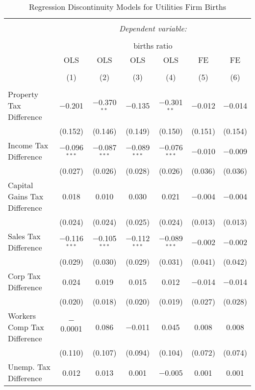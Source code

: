 
\begin{table}[!htbp] \centering 
  \caption{Regression Discontinuity Models for  Utilities Firm Births} 
  \label{22rd} 
\begin{tabular}{@{\extracolsep{5pt}}lcccccc} 
\\[-1.8ex]\hline 
\hline \\[-1.8ex] 
 & \multicolumn{6}{c}{\textit{Dependent variable:}} \\ 
\cline{2-7} 
\\[-1.8ex] & \multicolumn{6}{c}{births ratio} \\ 
 & OLS & OLS & OLS & OLS & FE & FE \\ 
\\[-1.8ex] & (1) & (2) & (3) & (4) & (5) & (6)\\ 
\hline \\[-1.8ex] 
 Property Tax Difference & $-$0.201 & $-$0.370$^{**}$ & $-$0.135 & $-$0.301$^{**}$ & $-$0.012 & $-$0.014 \\ 
  & (0.152) & (0.146) & (0.149) & (0.150) & (0.151) & (0.154) \\ 
  Income Tax Difference & $-$0.096$^{***}$ & $-$0.087$^{***}$ & $-$0.089$^{***}$ & $-$0.076$^{***}$ & $-$0.010 & $-$0.009 \\ 
  & (0.027) & (0.026) & (0.028) & (0.026) & (0.036) & (0.036) \\ 
  Capital Gains Tax Difference & 0.018 & 0.010 & 0.030 & 0.021 & $-$0.004 & $-$0.004 \\ 
  & (0.024) & (0.024) & (0.025) & (0.024) & (0.013) & (0.013) \\ 
  Sales Tax Difference & $-$0.116$^{***}$ & $-$0.105$^{***}$ & $-$0.112$^{***}$ & $-$0.089$^{***}$ & $-$0.002 & $-$0.002 \\ 
  & (0.029) & (0.030) & (0.029) & (0.031) & (0.041) & (0.042) \\ 
  Corp Tax Difference & 0.024 & 0.019 & 0.015 & 0.012 & $-$0.014 & $-$0.014 \\ 
  & (0.020) & (0.018) & (0.020) & (0.019) & (0.027) & (0.028) \\ 
  Workers Comp Tax Difference & $-$0.0001 & 0.086 & $-$0.011 & 0.045 & 0.008 & 0.008 \\ 
  & (0.110) & (0.107) & (0.094) & (0.104) & (0.072) & (0.074) \\ 
  Unemp. Tax Difference & 0.012 & 0.013 & 0.001 & $-$0.005 & 0.001 & 0.001 \\ 

\end{tabular}
\end{table}
